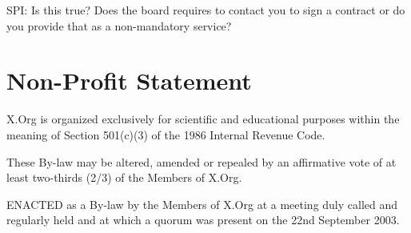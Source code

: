 \documentclass[10pt, english]{bylaws}
\begin{document}
SPI: Is this true? Does the board requires to contact you to sign a contract or
do you provide that as a non-mandatory service?

\section{Non-Profit Statement}
X.Org is organized exclusively for scientific and educational purposes within
the meaning of  Section 501(c)(3) of the 1986 Internal Revenue Code.

These By-law may be altered, amended or repealed by an affirmative vote of
at least two-thirds (2/3) of the Members of X.Org.

ENACTED as a By-law by the Members of X.Org at a meeting duly called and
regularly held and at which a quorum was present on the 22nd September 2003.
\end{document}
